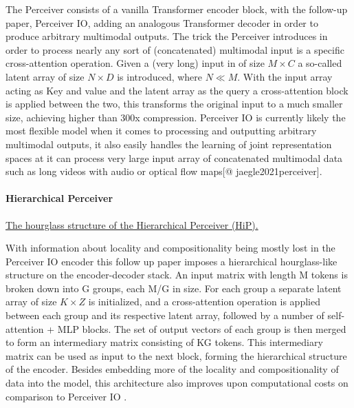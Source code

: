\documentclass[
]{krantz}
\begin{document}
The Perceiver consists of a vanilla Transformer encoder block, with the follow-up paper, Perceiver IO, adding an analogous Transformer decoder in order to produce arbitrary multimodal outputs. The trick the Perceiver introduces in order to process nearly any sort of (concatenated) multimodal input is a specific cross-attention operation. Given a (very long) input in of size \(M \times C\) a so-called latent array of size \(N\times D\) is introduced, where \(N\ll M\). With the input array acting as Key and value and the latent array as the query a cross-attention block is applied between the two, this transforms the original input to a much smaller size, achieving higher than 300x compression. Perceiver IO is currently likely the most flexible model when it comes to processing and outputting arbitrary multimodal outputs, it also easily handles the learning of joint representation spaces at it can process very large input array of concatenated multimodal data such as long videos with audio or optical flow maps\citep{DBLP:conf/icml/JaegleGBVZC21}{[}@ jaegle2021perceiver{]}.

\hypertarget{hierarchical-perceiver}{%
\paragraph{Hierarchical Perceiver}\label{hierarchical-perceiver}}

\href{figures/03-01/hierarchical-perceiver.png}{The hourglass structure of the Hierarchical Perceiver (HiP)\citep{carreira2022hierarchical}.}

With information about locality and compositionality being mostly lost in the Perceiver IO encoder this follow up paper imposes a hierarchical hourglass-like structure on the encoder-decoder stack. An input matrix with length M tokens is broken down into G groups, each M/G in size. For each group a separate latent array of size \(K \times Z\) is initialized, and a cross-attention operation is applied between each group and its respective latent array, followed by a number of self-attention + MLP blocks. The set of output vectors of each group is then merged to form an intermediary matrix consisting of KG tokens. This intermediary matrix can be used as input to the next block, forming the hierarchical structure of the encoder. Besides embedding more of the locality and compositionality of data into the model, this architecture also improves upon computational costs on comparison to Perceiver IO \citep{carreira2022hierarchical}.
\end{document}
